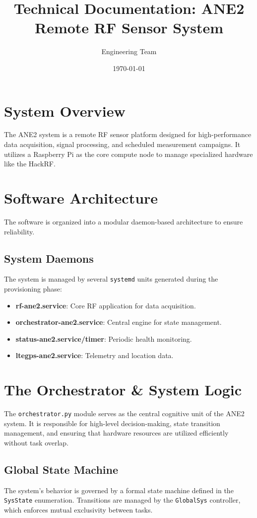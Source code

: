\documentclass{article}
\title{Technical Documentation: ANE2 Remote RF Sensor System}
\author{Engineering Team}
\date{\today}
\begin{document}
\maketitle
\tableofcontents
\newpage

\section{System Overview}
The ANE2 system is a remote RF sensor platform designed for high-performance data acquisition, signal processing, and scheduled measurement campaigns. It utilizes a Raspberry Pi as the core compute node to manage specialized hardware like the HackRF.

\section{Software Architecture}
The software is organized into a modular daemon-based architecture to ensure reliability.

\subsection{System Daemons}
The system is managed by several \texttt{systemd} units generated during the provisioning phase:
\begin{itemize}
    \item \textbf{rf-ane2.service}: Core RF application for data acquisition.
    \item \textbf{orchestrator-ane2.service}: Central engine for state management.
    \item \textbf{status-ane2.service/timer}: Periodic health monitoring.
    \item \textbf{ltegps-ane2.service}: Telemetry and location data.
\end{itemize}

\section{The Orchestrator \& System Logic}

The \texttt{orchestrator.py} module serves as the central cognitive unit of the ANE2 system. It is responsible for high-level decision-making, state transition management, and ensuring that hardware resources are utilized efficiently without task overlap.

\subsection{Global State Machine}
The system's behavior is governed by a formal state machine defined in the \texttt{SysState} enumeration. Transitions are managed by the \texttt{GlobalSys} controller, which enforces mutual exclusivity between tasks.
\end{document}
